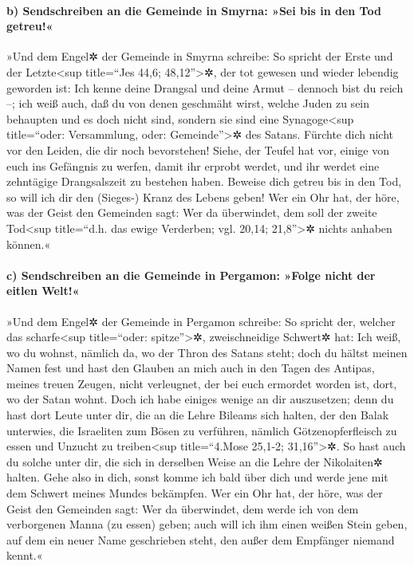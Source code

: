 \hypertarget{b-sendschreiben-an-die-gemeinde-in-smyrna-sei-bis-in-den-tod-getreu}{%
\paragraph{b) Sendschreiben an die Gemeinde in Smyrna: »Sei bis in den
Tod
getreu!«}\label{b-sendschreiben-an-die-gemeinde-in-smyrna-sei-bis-in-den-tod-getreu}}

 »Und dem Engel✲ der Gemeinde in Smyrna schreibe: So
spricht der Erste und der Letzte\textless sup title=``Jes 44,6;
48,12''\textgreater✲, der tot gewesen und wieder lebendig geworden ist:
 Ich kenne deine Drangsal und deine Armut -- dennoch bist
du reich --; ich weiß auch, daß du von denen geschmäht wirst, welche
Juden zu sein behaupten und es doch nicht sind, sondern sie sind eine
Synagoge\textless sup title=``oder: Versammlung, oder:
Gemeinde''\textgreater✲ des Satans.  Fürchte dich nicht
vor den Leiden, die dir noch bevorstehen! Siehe, der Teufel hat vor,
einige von euch ins Gefängnis zu werfen, damit ihr erprobt werdet, und
ihr werdet eine zehntägige Drangsalszeit zu bestehen haben. Beweise dich
getreu bis in den Tod, so will ich dir den (Sieges-) Kranz des Lebens
geben!  Wer ein Ohr hat, der höre, was der Geist den
Gemeinden sagt: Wer da überwindet, dem soll der zweite Tod\textless sup
title=``d.h. das ewige Verderben; vgl. 20,14; 21,8''\textgreater✲ nichts
anhaben können.«

\hypertarget{c-sendschreiben-an-die-gemeinde-in-pergamon-folge-nicht-der-eitlen-welt}{%
\paragraph{c) Sendschreiben an die Gemeinde in Pergamon: »Folge nicht
der eitlen
Welt!«}\label{c-sendschreiben-an-die-gemeinde-in-pergamon-folge-nicht-der-eitlen-welt}}

 »Und dem Engel✲ der Gemeinde in Pergamon schreibe: So
spricht der, welcher das scharfe\textless sup title=``oder:
spitze''\textgreater✲, zweischneidige Schwert✲ hat:  Ich
weiß, wo du wohnst, nämlich da, wo der Thron des Satans steht; doch du
hältst meinen Namen fest und hast den Glauben an mich auch in den Tagen
des Antipas, meines treuen Zeugen, nicht verleugnet, der bei euch
ermordet worden ist, dort, wo der Satan wohnt.  Doch ich
habe einiges wenige an dir auszusetzen; denn du hast dort Leute unter
dir, die an die Lehre Bileams sich halten, der den Balak unterwies, die
Israeliten zum Bösen zu verführen, nämlich Götzenopferfleisch zu essen
und Unzucht zu treiben\textless sup title=``4.Mose 25,1-2;
31,16''\textgreater✲.  So hast auch du solche unter dir,
die sich in derselben Weise an die Lehre der Nikolaiten✲ halten.
 Gehe also in dich, sonst komme ich bald über dich und
werde jene mit dem Schwert meines Mundes bekämpfen.  Wer
ein Ohr hat, der höre, was der Geist den Gemeinden sagt: Wer da
überwindet, dem werde ich von dem verborgenen Manna (zu essen) geben;
auch will ich ihm einen weißen Stein geben, auf dem ein neuer Name
geschrieben steht, den außer dem Empfänger niemand kennt.«

